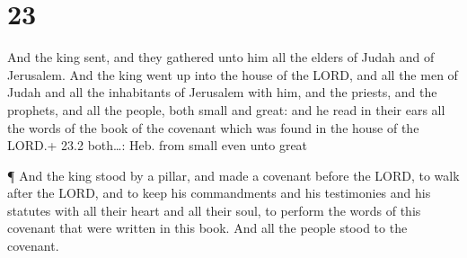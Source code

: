 \hypertarget{section-22}{%
\section{23}\label{section-22}}

 And the king sent, and they gathered unto him all the
elders of Judah and of Jerusalem.  And the king went up into
the house of the LORD, and all the men of Judah and all the inhabitants
of Jerusalem with him, and the priests, and the prophets, and all the
people, both small and great: and he read in their ears all the words of
the book of the covenant which was found in the house of the LORD.+ 23.2
both\ldots: Heb. from small even unto great

 ¶ And the king stood by a pillar, and made a covenant
before the LORD, to walk after the LORD, and to keep his commandments
and his testimonies and his statutes with all their heart and all their
soul, to perform the words of this covenant that were written in this
book. And all the people stood to the covenant.

